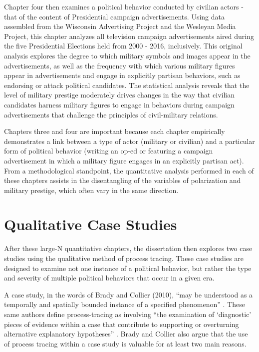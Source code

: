 \documentclass[
  12pt,
  oneside]{memoir}
\begin{document}
Chapter four then examines a political behavior conducted by civilian actors - that of the content of Presidential campaign advertisements. Using data assembled from the Wisconsin Advertising Project and the Wesleyan Media Project, this chapter analyzes all television campaign advertisements aired during the five Presidential Elections held from 2000 - 2016, inclusively. This original analysis explores the degree to which military symbols and images appear in the advertisements, as well as the frequency with which various military figures appear in advertisements and engage in explicitly partisan behaviors, such as endorsing or attack political candidates. The statistical analysis reveals that the level of military prestige moderately drives changes in the way that civilian candidates harness military figures to engage in behaviors during campaign advertisements that challenge the principles of civil-military relations.

Chapters three and four are important because each chapter empirically demonstrates a link between a type of actor (military or civilian) and a particular form of political behavior (writing an op-ed or featuring a campaign advertisement in which a military figure engages in an explicitly partisan act). From a methodological standpoint, the quantitative analysis performed in each of these chapters assists in the disentangling of the variables of polarization and military prestige, which often vary in the same direction.

\hypertarget{qualitative-case-studies}{%
\section{Qualitative Case Studies}\label{qualitative-case-studies}}

After these large-N quantitative chapters, the dissertation then explores two case studies using the qualitative method of process tracing. These case studies are designed to examine not one instance of a political behavior, but rather the type and severity of multiple political behaviors that occur in a given era.

A case study, in the words of Brady and Collier (2010), ``may be understood as a temporally and spatially bounded instance of a specified phenomenon'' \autocite[208]{brady_rethinking_2010}. These same authors define process-tracing as involving ``the examination of `diagnostic' pieces of evidence within a case that contribute to supporting or overturning alternative explanatory hypotheses'' \autocite[208]{brady_rethinking_2010}. Brady and Collier also argue that the use of process tracing within a case study is valuable for at least two main reasons.
\end{document}
